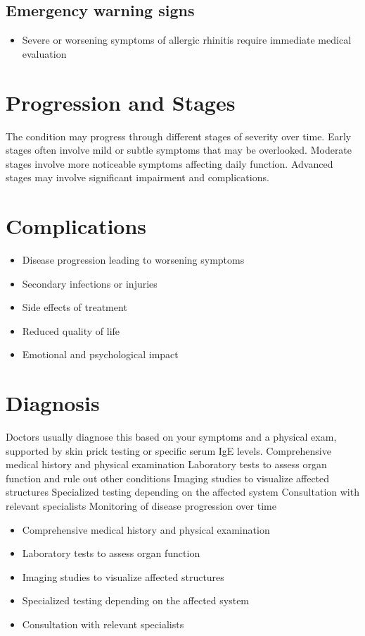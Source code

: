 \subsection{Emergency warning signs}
\begin{itemize}[noitemsep]
  \item Severe or worsening symptoms of allergic rhinitis require immediate medical evaluation
\end{itemize}
\section{Progression and Stages}
The condition may progress through different stages of severity over time. Early stages often involve mild or subtle symptoms that may be overlooked. Moderate stages involve more noticeable symptoms affecting daily function. Advanced stages may involve significant impairment and complications.
\section{Complications}
\begin{itemize}[noitemsep]
  \item Disease progression leading to worsening symptoms
  \item Secondary infections or injuries
  \item Side effects of treatment
  \item Reduced quality of life
  \item Emotional and psychological impact
\end{itemize}
\section{Diagnosis}
Doctors usually diagnose this based on your symptoms and a physical exam, supported by skin prick testing or specific serum IgE levels. Comprehensive medical history and physical examination Laboratory tests to assess organ function and rule out other conditions Imaging studies to visualize affected structures Specialized testing depending on the affected system Consultation with relevant specialists Monitoring of disease progression over time

\begin{itemize}[noitemsep]
  \item Comprehensive medical history and physical examination
  \item Laboratory tests to assess organ function
  \item Imaging studies to visualize affected structures
  \item Specialized testing depending on the affected system
  \item Consultation with relevant specialists
\end{itemize}
